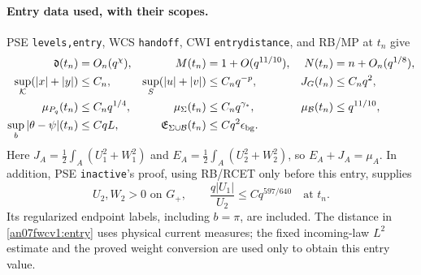 \documentclass[11pt]{article}
\numberwithin{equation}{section}
\newcommand{\KK}{\mathcal K}\newcommand{\BB}{\mathcal B}
\newcommand{\Gp}{G_+}\newcommand{\EE}{\mathfrak E}
\newcommand{\dist}{\mathfrak d}\newcommand{\one}{\mathbf1}
\begin{document}
\paragraph{Entry data used, with their scopes.}
PSE \texttt{levels,entry}, WCS \texttt{handoff}, CWI
\texttt{entrydistance}, and RB/MP at \(t_n\) give
\begin{align}
 \dist(t_n)&=O_n(q^\chi),& M(t_n)&=1+O(q^{11/10}),&
 N(t_n)&=n+O_n(q^{1/8}),\notag\\
 \sup_\KK(|x|+|y|)&\le C_n,&
 \sup_S(|u|+|v|)&\le C_nq^{-p},& J_G(t_n)&\le C_nq^2,\notag\\
 \mu_{P_q}(t_n)&\le C_nq^{1/4},&
 \mu_\Sigma(t_n)&\le C_nq^{\gamma_*},&
 \mu_\BB(t_n)&\le q^{11/10},\notag\\
 \sup_b|\theta-\psi|(t_n)&\le CqL,&
 \EE_{\Sigma\cup\BB}(t_n)&\le Cq^2\epsilon_{\rm bg}.
 \label{an07fwcv1:entry}
\end{align}
Here \(J_A=\tfrac12\int_A(U_1^2+W_1^2)\) and
\(E_A=\tfrac12\int_A(U_2^2+W_2^2)\), so
\(E_A+J_A=\mu_A\). In addition, PSE \texttt{inactive}'s proof,
using RB/RCET only before this entry, supplies
\begin{equation}
 U_2,W_2>0\text{ on }\Gp,\qquad
 \frac{q|U_1|}{U_2}\le Cq^{597/640}\quad\text{at }t_n.
 \label{an07fwcv1:primaryentry}
\end{equation}
Its regularized endpoint labels, including \(b=\pi\), are included.
The distance in \eqref{an07fwcv1:entry} uses physical current measures;
the fixed incoming-law \(L^2\) estimate and the proved weight conversion
are used only to obtain this entry value.
\end{document}
